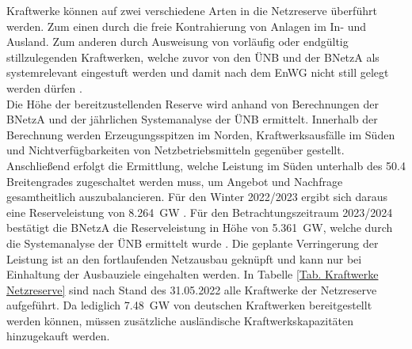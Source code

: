 			Kraftwerke können auf zwei verschiedene Arten in die Netzreserve überführt werden.
			Zum einen durch die freie Kontrahierung von Anlagen im In- und Ausland.
			Zum anderen durch Ausweisung von vorläufig oder endgültig stillzulegenden Kraftwerken, welche zuvor von den ÜNB und der BNetzA als systemrelevant eingestuft werden und damit nach dem EnWG nicht still gelegt werden dürfen \cite{EnWG}. \\
			
			Die Höhe der bereitzustellenden Reserve wird anhand von Berechnungen der BNetzA und der jährlichen Systemanalyse der ÜNB ermittelt.
			Innerhalb der Berechnung werden Erzeugungsspitzen im Norden, Kraftwerksausfälle im Süden und Nichtverfügbarkeiten von Netzbetriebsmitteln gegenüber gestellt.
			Anschließend erfolgt die Ermittlung, welche Leistung im Süden unterhalb des \num{50,4} Breitengrades zugeschaltet werden muss, um Angebot und Nachfrage gesamtheitlich auszubalancieren.
			Für den Winter 2022/2023 ergibt sich daraus eine Reserveleistung von \SI{8,264}{\giga\watt} \cite{Bedarf_Netz_Kapa_Reserve}.
			Für den Betrachtungszeitraum 2023/2024 bestätigt die BNetzA die Reserveleistung in Höhe von \SI{5,361}{\giga\watt}, welche durch die Systemanalyse der ÜNB ermittelt wurde \cite{Bedarf_Netz_Kapa_Reserve}.		
			Die geplante Verringerung der Leistung ist an den fortlaufenden Netzausbau geknüpft und kann nur bei Einhaltung der Ausbauziele eingehalten werden. 
			In Tabelle \ref{Tab. Kraftwerke Netzreserve} sind nach Stand des 31.05.2022 alle Kraftwerke der Netzreserve aufgeführt. 
			Da lediglich \SI{7,48}{\giga\watt} von deutschen Kraftwerken bereitgestellt werden können, müssen zusätzliche ausländische Kraftwerkskapazitäten hinzugekauft werden. 
			

